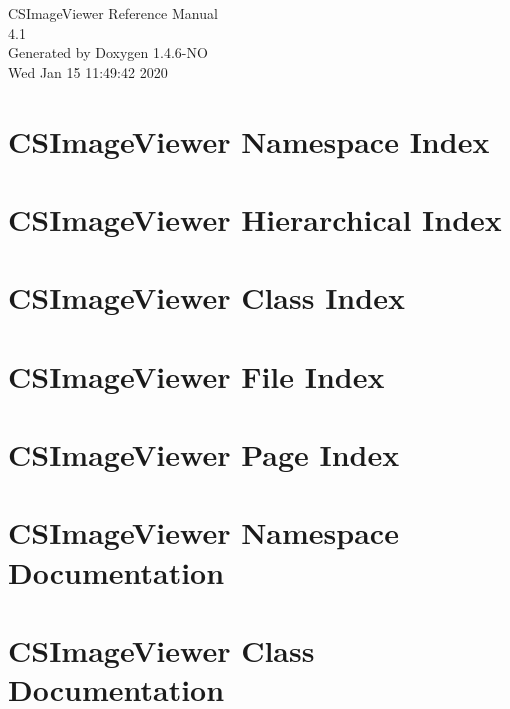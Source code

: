 \documentclass[a4paper]{book}
\begin{document}
\begin{titlepage}
\vspace*{7cm}
\begin{center}
{\Large CSImage\-Viewer Reference Manual\\[1ex]\large 4.1 }\\
\vspace*{1cm}
{\large Generated by Doxygen 1.4.6-NO}\\
\vspace*{0.5cm}
{\small Wed Jan 15 11:49:42 2020}\\
\end{center}
\end{titlepage}
\clearemptydoublepage
{}
\tableofcontents
\clearemptydoublepage
{}
\chapter{CSImage\-Viewer Namespace Index}

\chapter{CSImage\-Viewer Hierarchical Index}

\chapter{CSImage\-Viewer Class Index}

\chapter{CSImage\-Viewer File Index}

\chapter{CSImage\-Viewer Page Index}

\chapter{CSImage\-Viewer Namespace Documentation}









\chapter{CSImage\-Viewer Class Documentation}








\end{document}
